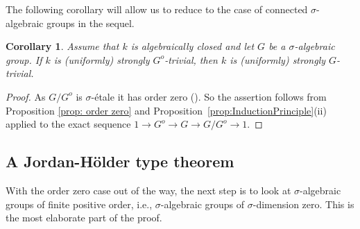 \documentclass[oneside,reqno]{amsart}
\newtheorem{lemma}[theo]{Lemma}
\newtheorem{cor}[theo]{Corollary}
\theoremstyle{definition}
\newcommand{\s}{\sigma}
\newcommand{\ks}{$k$\=/$\s$}
\newcommand{\pt}{{\rm{(P3$^u$)}}}
\newcommand{\ptweak}{{\rm{(P3)}}}
\begin{document}
%
The following corollary will allow us to reduce to the case of connected $\s$-algebraic groups in the sequel.
	
\begin{cor} \label{cor: reduce to connected} Assume that $k$ is algebraically closed and let $G$ be a $\s$-algebraic group. If $k$ is (uniformly) strongly $G^o$-trivial, then $k$ is (uniformly) strongly $G$-trivial. 
\end{cor}
\begin{proof}
As $G/G^o$ is $\s$-\'{e}tale it has order zero (\cite[Prop. 4.8]{Wibmer:etale}). So the assertion follows from Proposition \ref{prop: order zero} and Proposition~\ref{prop:InductionPrinciple}(ii) applied to the exact sequence
$1\to G^o\to G\to G/G^o\to 1$.
\end{proof}











\subsection{A Jordan-H\"{o}lder type theorem}
\label{subsec: Jordan Hoelder}



With the order zero case out of the way, the next step is to look at $\s$-algebraic groups of finite positive order, i.e., $\s$-algebraic groups of $\s$-dimension zero. This is the most elaborate part of the proof.
%
\end{document}
